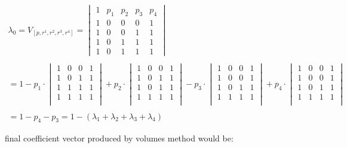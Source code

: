 \begin{}
	\begin{equation} \label{eq1}
	\begin{split}
	\lambda_0 =	V_{[p,r^1,r^2,r^3,r^4]} = 
	\begin{vmatrix}
	1 & p_{1} &  p_{2}& p_{3} & p_{4}\\
	1 & 0 & 0 & 0 & 1\\ 
	1 & 0 & 0 & 1 & 1\\ 
	1 &  0  & 1 & 1 & 1 \\ 
	1 & 0 & 1 & 1 & 1
	\end{vmatrix} 
	\\ \\
	= 1 - p_1 \cdot \begin{vmatrix} 1 & 0 & 0 & 1 \\ 1 & 0 & 1 & 1 \\ 1 & 1 & 1 & 1 \\ 1 & 1 & 1 & 1 \\ \end{vmatrix} + 
	p_2 \cdot \begin{vmatrix} 1 & 0 & 0 & 1 \\ 1 & 0 & 1 & 1 \\ 1 & 0 & 1 & 1 \\ 1 & 1 & 1 & 1 \\ \end{vmatrix} - 
	p_3 \cdot \begin{vmatrix} 1 & 0 & 0 & 1 \\ 1 & 0 & 0 & 1 \\ 1 & 0 & 1 & 1 \\ 1 & 1 & 1 & 1 \\ \end{vmatrix} + 
	p_4 \cdot \begin{vmatrix} 1 & 0 & 0 & 1 \\ 1 & 0 & 0 & 1 \\ 1 & 0 & 1 & 1 \\ 1 & 1 & 1 & 1 \\ \end{vmatrix} \\ \\ 
	= 1 - p_4 - p_3 = 1 - (\lambda_1 + \lambda_2 + \lambda_3 + \lambda_4)
	\end{split}
	\end{equation}

	
		final coefficient vector produced by volumes method would be:
		

\end{}
